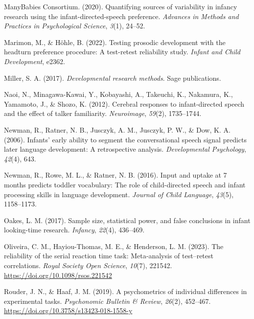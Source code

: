 \documentclass[
  english,
  man,floatsintext]{apa6}
\newlength{\cslhangindent}
\newlength{\cslentryspacingunit} %
\newenvironment{CSLReferences}[2] %
 {%
  \setlength{\parindent}{0pt}
  \ifodd #1
  \let\oldpar\par
  \def\par{\hangindent=\cslhangindent\oldpar}
  \fi
  \setlength{\parskip}{#2\cslentryspacingunit}
 }%
 {}
\begin{document}
\begin{CSLReferences}{1}{0}
\leavevmode{}%
ManyBabies Consortium. (2020). Quantifying sources of variability in infancy research using the infant-directed-speech preference. \emph{Advances in Methods and Practices in Psychological Science}, \emph{3}(1), 24--52.

\leavevmode{}%
Marimon, M., \& Höhle, B. (2022). Testing prosodic development with the headturn preference procedure: A test-retest reliability study. \emph{Infant and Child Development}, e2362.

\leavevmode{}%
Miller, S. A. (2017). \emph{Developmental research methods}. Sage publications.

\leavevmode{}%
Naoi, N., Minagawa-Kawai, Y., Kobayashi, A., Takeuchi, K., Nakamura, K., Yamamoto, J., \& Shozo, K. (2012). Cerebral responses to infant-directed speech and the effect of talker familiarity. \emph{Neuroimage}, \emph{59}(2), 1735--1744.

\leavevmode{}%
Newman, R., Ratner, N. B., Jusczyk, A. M., Jusczyk, P. W., \& Dow, K. A. (2006). Infants' early ability to segment the conversational speech signal predicts later language development: A retrospective analysis. \emph{Developmental Psychology}, \emph{42}(4), 643.

\leavevmode{}%
Newman, R., Rowe, M. L., \& Ratner, N. B. (2016). Input and uptake at 7 months predicts toddler vocabulary: The role of child-directed speech and infant processing skills in language development. \emph{Journal of Child Language}, \emph{43}(5), 1158--1173.

\leavevmode{}%
Oakes, L. M. (2017). Sample size, statistical power, and false conclusions in infant looking-time research. \emph{Infancy}, \emph{22}(4), 436--469.

\leavevmode{}%
Oliveira, C. M., Hayiou-Thomas, M. E., \& Henderson, L. M. (2023). The reliability of the serial reaction time task: Meta-analysis of test--retest correlations. \emph{Royal Society Open Science}, \emph{10}(7), 221542. \url{https://doi.org/10.1098/rsos.221542}

\leavevmode{}%
Rouder, J. N., \& Haaf, J. M. (2019). A psychometrics of individual differences in experimental tasks. \emph{Psychonomic Bulletin \& Review}, \emph{26}(2), 452--467. \url{https://doi.org/10.3758/s13423-018-1558-y}


\end{CSLReferences}
\end{document}
